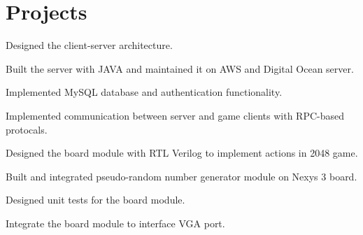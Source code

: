 \documentclass[]{deedy-resume-openfont}
\begin{document}
\hfill
\begin{minipage}[t]{0.66\textwidth} 


\section{Projects}

\vspace{\topsep} %
\begin{tightemize}
	\item Designed the client-server architecture.
	\item Built the server with JAVA and maintained it on AWS and Digital Ocean server.
	\item Implemented MySQL database and authentication functionality.
	\item Implemented communication between server and game clients with RPC-based protocals.
\end{tightemize}
\sectionsep

\begin{tightemize}
	\item Designed the board module with RTL Verilog to implement actions in 2048 game.
	\item Built and integrated pseudo-random number generator module on Nexys 3 board.
	\item Designed unit tests for the board module.
	\item Integrate the board module to interface VGA port.
\end{tightemize}
\sectionsep




\end{minipage}
\end{document}
